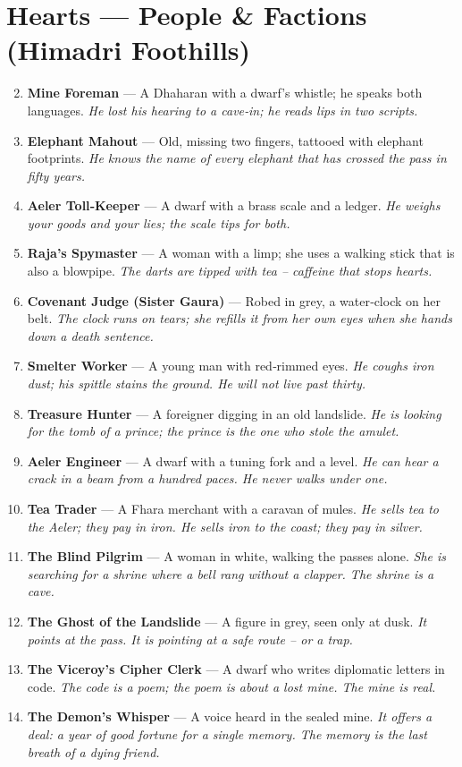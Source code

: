 \documentclass[11pt]{book}
\begin{document}
\section*{Hearts — People \& Factions (Himadri Foothills)}
\begin{enumerate}
\setcounter{enumi}{1}
\item \textbf{Mine Foreman} — A Dhaharan with a dwarf’s whistle; he speaks both languages. \textit{He lost his hearing to a cave‑in; he reads lips in two scripts.}
\item \textbf{Elephant Mahout} — Old, missing two fingers, tattooed with elephant footprints. \textit{He knows the name of every elephant that has crossed the pass in fifty years.}
\item \textbf{Aeler Toll‑Keeper} — A dwarf with a brass scale and a ledger. \textit{He weighs your goods and your lies; the scale tips for both.}
\item \textbf{Raja’s Spymaster} — A woman with a limp; she uses a walking stick that is also a blowpipe. \textit{The darts are tipped with tea – caffeine that stops hearts.}
\item \textbf{Covenant Judge (Sister Gaura)} — Robed in grey, a water‑clock on her belt. \textit{The clock runs on tears; she refills it from her own eyes when she hands down a death sentence.}
\item \textbf{Smelter Worker} — A young man with red‑rimmed eyes. \textit{He coughs iron dust; his spittle stains the ground. He will not live past thirty.}
\item \textbf{Treasure Hunter} — A foreigner digging in an old landslide. \textit{He is looking for the tomb of a prince; the prince is the one who stole the amulet.}
\item \textbf{Aeler Engineer} — A dwarf with a tuning fork and a level. \textit{He can hear a crack in a beam from a hundred paces. He never walks under one.}
\item \textbf{Tea Trader} — A Fhara merchant with a caravan of mules. \textit{He sells tea to the Aeler; they pay in iron. He sells iron to the coast; they pay in silver.}
\item[J] \textbf{The Blind Pilgrim} — A woman in white, walking the passes alone. \textit{She is searching for a shrine where a bell rang without a clapper. The shrine is a cave.}
\item[Q] \textbf{The Ghost of the Landslide} — A figure in grey, seen only at dusk. \textit{It points at the pass. It is pointing at a safe route – or a trap.}
\item[K] \textbf{The Viceroy’s Cipher Clerk} — A dwarf who writes diplomatic letters in code. \textit{The code is a poem; the poem is about a lost mine. The mine is real.}
\item[A] \textbf{The Demon’s Whisper} — A voice heard in the sealed mine. \textit{It offers a deal: a year of good fortune for a single memory. The memory is the last breath of a dying friend.}
\end{enumerate}
\end{document}
